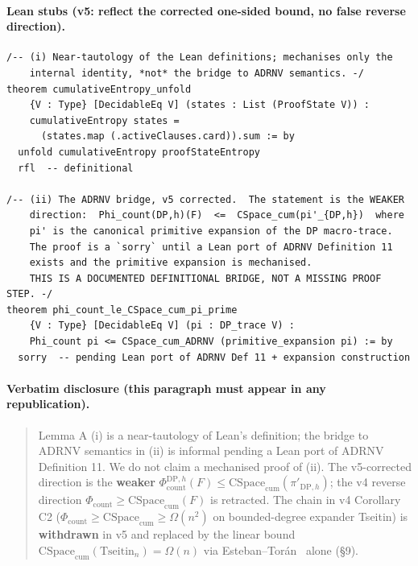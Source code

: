 \documentclass[11pt,a4paper]{article}
\theoremstyle{remark}
\begin{document}
\paragraph{Lean stubs (v5: reflect the corrected one-sided bound, no false
reverse direction).}

\begin{lstlisting}[language=lean]
/-- (i) Near-tautology of the Lean definitions; mechanises only the
    internal identity, *not* the bridge to ADRNV semantics. -/
theorem cumulativeEntropy_unfold
    {V : Type} [DecidableEq V] (states : List (ProofState V)) :
    cumulativeEntropy states =
      (states.map (.activeClauses.card)).sum := by
  unfold cumulativeEntropy proofStateEntropy
  rfl  -- definitional

/-- (ii) The ADRNV bridge, v5 corrected.  The statement is the WEAKER
    direction:  Phi_count(DP,h)(F)  <=  CSpace_cum(pi'_{DP,h})  where
    pi' is the canonical primitive expansion of the DP macro-trace.
    The proof is a `sorry` until a Lean port of ADRNV Definition 11
    exists and the primitive expansion is mechanised.
    THIS IS A DOCUMENTED DEFINITIONAL BRIDGE, NOT A MISSING PROOF STEP. -/
theorem phi_count_le_CSpace_cum_pi_prime
    {V : Type} [DecidableEq V] (pi : DP_trace V) :
    Phi_count pi <= CSpace_cum_ADRNV (primitive_expansion pi) := by
  sorry  -- pending Lean port of ADRNV Def 11 + expansion construction
\end{lstlisting}

\paragraph{Verbatim disclosure (this paragraph must appear in any republication).}
\begin{quote}
Lemma A (i) is a near-tautology of Lean's definition; the bridge to ADRNV
semantics in (ii) is informal pending a Lean port of ADRNV Definition 11.
We do not claim a mechanised proof of (ii). The v5-corrected direction is
the \textbf{weaker} $\Phi_{\mathrm{count}}^{\mathrm{DP},h}(F) \le
\mathrm{CSpace}_{\mathrm{cum}}(\pi'_{\mathrm{DP},h})$; the v4 reverse
direction $\Phi_{\mathrm{count}} \ge \mathrm{CSpace}_{\mathrm{cum}}(F)$ is
retracted. The chain in v4 Corollary C2 ($\Phi_{\mathrm{count}} \ge
\mathrm{CSpace}_{\mathrm{cum}} \ge \Omega(n^2)$ on bounded-degree expander
Tseitin) is \textbf{withdrawn} in v5 and replaced by the linear bound
$\mathrm{CSpace}_{\mathrm{cum}}(\mathrm{Tseitin}_n) = \Omega(n)$ via
Esteban--Tor\'an~\cite{EstebanToran1999} alone (\S9).
\end{quote}
\end{document}
